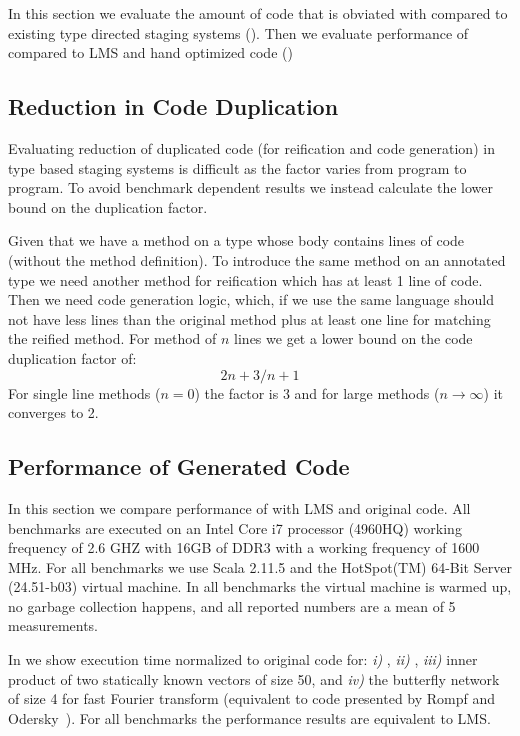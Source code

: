 In this section we evaluate the amount of code that is obviated with \ct compared to existing
type directed staging systems (). Then we evaluate performance of
\ct compared to LMS and hand optimized code ()

\subsection{Reduction in Code Duplication}
\label{sct:duplication}

Evaluating reduction of duplicated code (for reification and code generation) in type based
staging systems is difficult as the factor varies from program to program. To avoid benchmark dependent
results we instead calculate the lower bound on the duplication factor.

Given that we have a method on a type  whose body contains  lines of code (without
the method definition). To introduce the same method on an annotated type  we need another
 method for reification which has at least 1 line of code. Then we need code generation
 logic, which, if we use the same language should not have less lines than the original method
 plus at least one line for matching the reified method. For method of $n$ lines
 we get a lower bound on the code duplication factor of:$$
 2n+3/n+1
$$
For single line methods ($n=0$) the factor is 3 and for large methods ($n\rightarrow\infty$) it converges to 2.

\subsection{Performance of Generated Code}

In this section we compare performance of \ct with LMS and original code. All benchmarks
are executed on an Intel Core i7 processor (4960HQ) working frequency of 2.6 GHZ with 16GB
of DDR3 with a working frequency of 1600 MHz. For all benchmarks we use Scala
2.11.5 and the HotSpot(TM) 64-Bit Server (24.51-b03) virtual machine. In all benchmarks
the virtual machine is warmed up, no garbage collection happens, and all reported numbers are
a mean of 5 measurements.

In  we show execution time normalized to original code for:
 \emph{i)} ,
 \emph{ii)} ,
 \emph{iii)} inner product of two statically known vectors of size 50,
 and \emph{iv)} the butterfly network of size 4 for fast Fourier transform  (equivalent to code presented by Rompf and Odersky~\cite{rompf2012lightweight}). For all benchmarks the performance results are equivalent to LMS.

